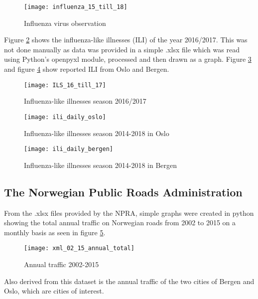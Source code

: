 \begin{figure}[h]
\texttt{[image: influenza\_15\_till\_18]}
\centering
\caption{Influenza virus observation}
\label{fig:infstat}
\end{figure}

Figure \ref{fig:ilsstat} shows the influenza-like illnesses (ILI) of the year 2016/2017. This was not done manually as data was provided in a simple .xlsx file which was read using Python's openpyxl module, processed and then drawn as a graph. Figure \ref{fig:ili_oslo} and figure \ref{fig:ili_bergen} show reported ILI from Oslo and Bergen.

\begin{figure}[ht]
\texttt{[image: ILS\_16\_till\_17]}
\centering
\caption{Influenza-like illnesses season 2016/2017}
\label{fig:ilsstat}
\end{figure}

\begin{figure}[ht]
\texttt{[image: ili\_daily\_oslo]}
\centering
\caption{Influenza-like illnesses season 2014-2018 in Oslo}
\label{fig:ili_oslo}
\end{figure}

\begin{figure}[!htb]
\texttt{[image: ili\_daily\_bergen]}
\centering
\caption{Influenza-like illnesses season 2014-2018 in Bergen}
\label{fig:ili_bergen}
\end{figure}

\newpage









\subsection{The Norwegian Public Roads Administration}
From the .xlsx files provided by the NPRA, simple graphs were created in python showing the total annual traffic on Norwegian roads from 2002 to 2015 on a monthly basis as seen in figure \ref{fig:anualtotal}.

\begin{figure}[ht]
\texttt{[image: xml\_02\_15\_annual\_total]}
\centering
\caption{Annual traffic 2002-2015}
\label{fig:anualtotal}
\end{figure}

Also derived from this dataset is the annual traffic of the two cities of Bergen and Oslo, which are cities of interest.

